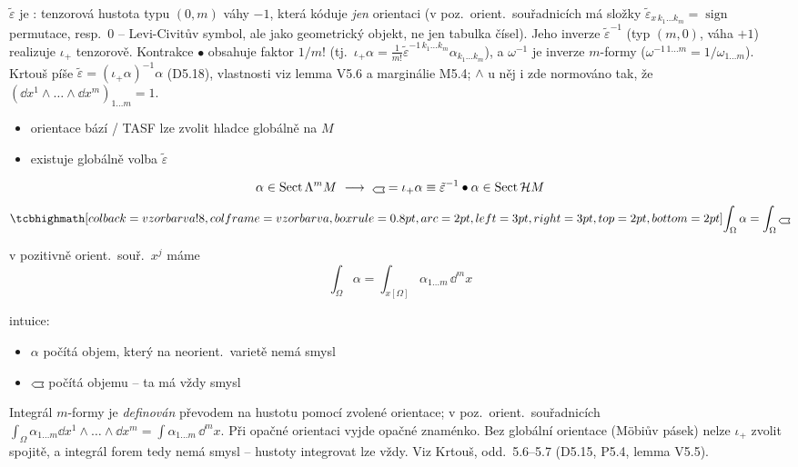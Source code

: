 \begin{vysvetleni}
$\tilde\varepsilon$ je : tenzorová hustota typu $(0,m)$ váhy $-1$, která kóduje \emph{jen} orientaci
(v poz.\ orient.\ souřadnicích má složky $\tilde\varepsilon_{x\,k_1\dots k_m} = \operatorname{sign}$ permutace, resp.\ $0$ -- Levi-Civitův symbol,
ale jako geometrický objekt, ne jen tabulka čísel). Jeho inverze $\tilde\varepsilon^{-1}$ (typ $(m,0)$, váha $+1$) realizuje $\iota_+$ tenzorově.
Kontrakce $\bullet$ obsahuje faktor $1/m!$ (tj.\ $\iota_+\alpha = \frac{1}{m!}\tilde\varepsilon^{-1\,k_1\dots k_m}\alpha_{k_1\dots k_m}$),
a $\omega^{-1}$ je inverze $m$-formy ($\omega^{-1\,1\dots m} = 1/\omega_{1\dots m}$).
Krtouš píše $\tilde\varepsilon = (\iota_+\alpha)^{-1}\alpha$ (D5.18), vlastnosti viz lemma V5.6 a marginálie M5.4; $\wedge$ u něj i zde normováno tak,
že $(\dd x^1\wedge\dots\wedge\dd x^m)_{1\dots m}=1$.
\end{vysvetleni}

\begin{itemize}[nosep]
  \item[--] orientace bází / TASF lze zvolit hladce globálně na $M$
  \item[--] existuje globálně volba $\tilde\varepsilon$
\end{itemize}

\begin{definice}
\[
  \alpha\in\mathrm{Sect}\,\Lambda^mM \ \longrightarrow\ \gmIhustsym = \iota_+\alpha \equiv \tilde\varepsilon^{-1}\bullet\alpha\in\mathrm{Sect}\,\mathcal{H}M
\]
\[
  \vzorec{\int_\Omega\alpha = \int_\Omega\gmIhustsym}
\]
\end{definice}
v pozitivně orient.\ souř.\ $x^j$ máme
\[
  \int_\Omega\alpha = \int_{x[\Omega]}\alpha_{1\dots m}\,\dd^m x
\]


intuice:
\begin{itemize}[nosep]
  \item[] $\alpha$ \quad počítá  objem, který na neorient.\ varietě nemá smysl
  \item[] $\gmIhustsym$ \quad počítá  objemu -- ta má vždy smysl
\end{itemize}

\begin{vysvetleni}
Integrál $m$-formy je \emph{definován} převodem na hustotu pomocí zvolené orientace; v poz.\ orient.\ souřadnicích
$\int_\Omega \alpha_{1\dots m}\dd x^1\wedge\dots\wedge\dd x^m = \int\alpha_{1\dots m}\,\dd^m x$. Při opačné orientaci vyjde opačné znaménko.
Bez globální orientace (Möbiův pásek) nelze $\iota_+$ zvolit spojitě, a integrál forem tedy nemá smysl -- hustoty integrovat lze vždy.
Viz Krtouš, odd.~5.6--5.7 (D5.15, P5.4, lemma V5.5).
\end{vysvetleni}

